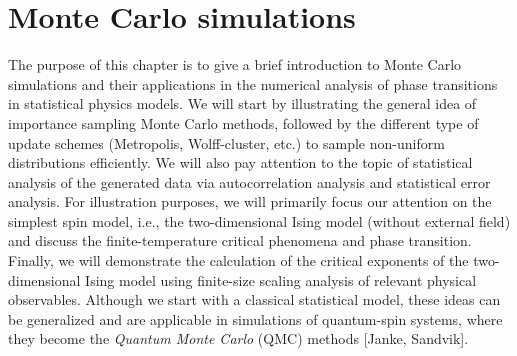 \documentclass[../journal_main.tex]{subfiles}
\begin{document}
\chapter{Monte Carlo simulations}
The purpose of this chapter is to give a brief introduction to Monte Carlo simulations and their applications in the numerical analysis of phase transitions in statistical physics models. We will start by illustrating the general idea of importance sampling Monte Carlo methods, followed by the different type of update schemes (Metropolis, Wolff-cluster, etc.) to sample non-uniform distributions efficiently. We will also pay attention to the topic of statistical analysis of the generated data via autocorrelation analysis and statistical error analysis. For illustration purposes, we will primarily focus our attention on the simplest spin model, i.e., the two-dimensional Ising model (without external field) and discuss the finite-temperature critical phenomena and phase transition. Finally, we will demonstrate the calculation of the critical exponents of the two-dimensional Ising model using finite-size scaling analysis of relevant physical observables. Although we start with a classical statistical model, these ideas can be generalized and are applicable in simulations of quantum-spin systems, where they become the \textit{Quantum Monte Carlo} (QMC) methods [Janke, Sandvik]. 
\end{document}
